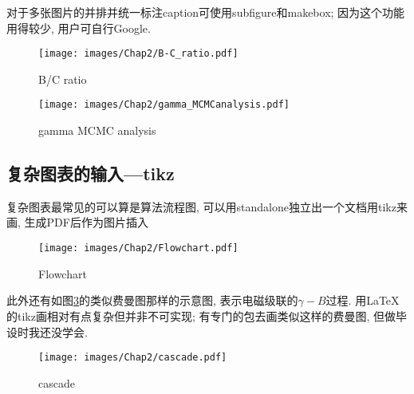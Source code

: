 \documentclass{scutbthesis}
\begin{document}
对于多张图片的并排并统一标注caption可使用subfigure和makebox; 因为这个功能用得较少, 用户可自行Google.

\begin{figure}[th]
\parbox[t]{0.5\textwidth}{
\texttt{[image: images/Chap2/B-C\_ratio.pdf]}
\caption{B/C ratio}
\label{B-C_ratio}
}
\parbox[t]{0.5\textwidth}{
\texttt{[image: images/Chap2/gamma\_MCMCanalysis.pdf]}
\caption{gamma MCMC analysis}
\label{fig:gamma_MCMCanalysis}
}
\end{figure}

\subsection{复杂图表的输入---tikz}
\label{sec:tikz}
复杂图表最常见的可以算是算法流程图, 可以用standalone独立出一个文档用tikz来画, 生成PDF后作为图片插入
\begin{figure}[ht]
\centering
\texttt{[image: images/Chap2/Flowchart.pdf]}
\caption{Flowchart}
\label{Flowchart}
\end{figure}

\noindent 此外还有如图\ref{cascade}的类似费曼图那样的示意图, 表示电磁级联的$\gamma-B$过程. 用\LaTeX 的tikz画相对有点复杂但并非不可实现; 有专门的包去画类似这样的费曼图, 但做毕设时我还没学会.
\begin{figure}[ht]
\centering
\texttt{[image: images/Chap2/cascade.pdf]}
\caption{cascade}
\label{cascade}
\end{figure}

\end{document}

